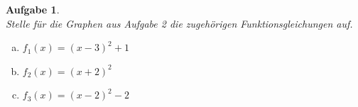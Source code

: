 \documentclass[12pt,fleqn]{article}
\theoremstyle{aufg}
\newtheorem{aufgabe}{Aufgabe}
\theoremstyle{bsp}
\begin{document}
\begin{flushleft}
\begin{aufgabe} ~ \\ 
Stelle f\"ur die Graphen aus Aufgabe 2 die zugeh\"origen Funktionsgleichungen auf. 
\begin{multicols}{3} 
\begin{enumerate}[a)] 
\item 
$f_1(x)=\left(x - 3\right)^{2} + 1$
\item 
$f_2(x)=\left(x + 2\right)^{2}$
\item 
$f_3(x)=\left(x - 2\right)^{2} - 2$
\end{enumerate} 
\end{multicols} 
\end{aufgabe} 
\end{flushleft} 
\end{document}
